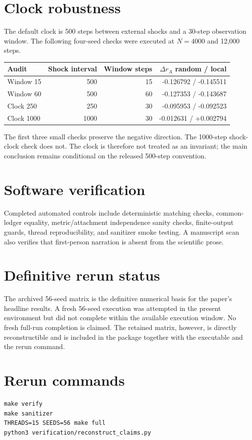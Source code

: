 \documentclass[11pt]{article}
\begin{document}
\section{Clock robustness}
The default clock is 500 steps between external shocks and a 30-step observation window. The following four-seed checks were executed at $N=4000$ and 12,000 steps.
\begin{center}
\begin{tabular}{lrrr}
\toprule
Audit & Shock interval & Window steps & $\Delta r_A$ random / local\\
\midrule
Window 15 & 500 & 15 & -0.126792 / -0.145511\\
Window 60 & 500 & 60 & -0.127353 / -0.143687\\
Clock 250 & 250 & 30 & -0.095953 / -0.092523\\
Clock 1000 & 1000 & 30 & -0.012631 / +0.002794\\
\bottomrule
\end{tabular}
\end{center}
The first three small checks preserve the negative direction. The 1000-step shock-clock check does not. The clock is therefore not treated as an invariant; the main conclusion remains conditional on the released 500-step convention.

\section{Software verification}
Completed automated controls include deterministic matching checks, common-ledger equality, metric/attachment independence sanity checks, finite-output guards, thread reproducibility, and sanitizer smoke testing. A manuscript scan also verifies that first-person narration is absent from the scientific prose.

\section{Definitive rerun status}
The archived 56-seed matrix is the definitive numerical basis for the paper's headline results. A fresh 56-seed execution was attempted in the present environment but did not complete within the available execution window. No fresh full-run completion is claimed. The retained matrix, however, is directly reconstructible and is included in the package together with the executable and the rerun command.

\section{Rerun commands}
\begin{verbatim}
make verify
make sanitizer
THREADS=15 SEEDS=56 make full
python3 verification/reconstruct_claims.py
\end{verbatim}
\end{document}

